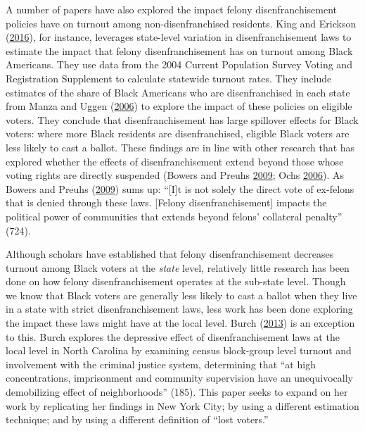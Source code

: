 \documentclass[]{article}
\begin{document}
A number of papers have also explored the impact felony disenfranchisement policies have on turnout among non-disenfranchised residents. King and Erickson (\protect\hyperlink{ref-King2016}{2016}), for instance, leverages state-level variation in disenfranchisement laws to estimate the impact that felony disenfranchisement has on turnout among Black Americans. They use data from the 2004 Current Population Survey Voting and Registration Supplement to calculate statewide turnout rates. They include estimates of the share of Black Americans who are disenfranchised in each state from Manza and Uggen (\protect\hyperlink{ref-locked_out}{2006}) to explore the impact of these policies on eligible voters. They conclude that disenfranchisement has large spillover effects for Black voters: where more Black residents are disenfranchised, eligible Black voters are less likely to cast a ballot. These findings are in line with other research that has explored whether the effects of disenfranchisement extend beyond those whose voting rights are directly suspended (Bowers and Preuhs \protect\hyperlink{ref-Bowers2009}{2009}; Ochs \protect\hyperlink{ref-Ochs2006}{2006}). As Bowers and Preuhs (\protect\hyperlink{ref-Bowers2009}{2009}) sums up: ``{[}I{]}t is not solely the direct vote of ex-felons that is denied through these laws. {[}Felony disenfranchisement{]} impacts the political power of communities that extends beyond felons' collateral penalty'' (724).

Although scholars have established that felony disenfranchisement decreases turnout among Black voters at the \emph{state} level, relatively little research has been done on how felony disenfranchisement operates at the sub-state level. Though we know that Black voters are generally less likely to cast a ballot when they live in a state with strict disenfranchisement laws, less work has been done exploring the impact these laws might have at the local level. Burch (\protect\hyperlink{ref-Burch2013}{2013}) is an exception to this. Burch explores the depressive effect of disenfranchisement laws at the local level in North Carolina by examining census block-group level turnout and involvement with the criminal justice system, determining that ``at high concentrations, imprisonment and community supervision have an unequivocally demobilizing effect of neighborhoods'' (185). This paper seeks to expand on her work by replicating her findings in New York City; by using a different estimation technique; and by using a different definition of ``lost voters.''
\end{document}
